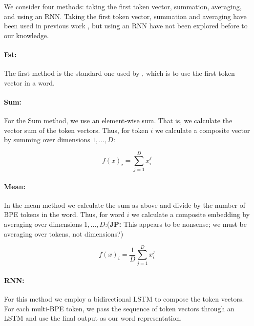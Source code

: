 \documentclass[11pt]{article}
\newcommand\jp[1]{(\textbf{JP:} #1)}
\newcommand\citet{\newcite}
\newcommand\citep{\cite}
\begin{document}

                    We consider four methods: taking the first
     token vector, summation, averaging, and using an RNN. Taking the first
     token vector, summation and averaging have been used in previous
     work \citep{sachan2020syntax,kondratyuk2019cross,devlin2018bert},
     but using an RNN have not been explored before to our knowledge.

        \paragraph{Fst:} The first method is the standard one used by
     \citet{devlin2018bert}, which is to use the first token vector in a word.
    
     \paragraph{Sum:} For the Sum method, we use an element-wise
     sum. That is, we calculate the vector sum of the token
     vectors. Thus, for token $i$ we calculate a composite vector
     by summing over dimensions $1,\ldots,D$:
	
	\begin{equation}
	f(x)_i = \sum_{j=1}^{D} x_i^j
	\end{equation}
	

     \paragraph{Mean:} In the mean method we calculate the sum as above and
     divide by the number of BPE tokens in the word. Thus, for
     word $i$ we calculate a composite embedding by averaging over
     dimensions $1,\ldots,D$:\jp{This appears to be nonsense; we must be averaging over tokens, not dimensions?}
	
	\begin{equation}
	f(x)_{i} = \frac{1}{D}\sum_{j=1}^{D} x_i^j
	\end{equation}
	
	
     \paragraph{RNN:} For this method we employ a bidirectional
     LSTM to compose the token vectors. For each multi-BPE token, we
     pass the sequence of token vectors through an LSTM and use the
     final output as our word representation.
\end{document}
